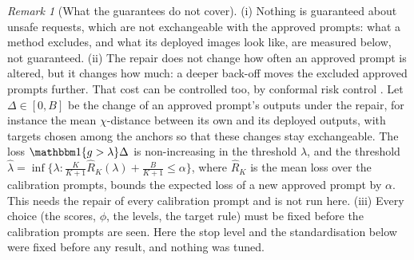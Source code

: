 \documentclass{article}
\theoremstyle{plain}
\theoremstyle{remark}
\newtheorem{remark}[theorem]{Remark}
\begin{document}
\begin{remark}[What the guarantees do not cover]\label{rem:combined}
(i) Nothing is guaranteed about unsafe requests, which are not exchangeable with the approved prompts: what a method excludes, and
what its deployed images look like, are measured below, not guaranteed. (ii) The repair does not change how often an approved
prompt is altered, but it changes how much: a deeper back-off moves the excluded approved prompts further. That cost can be
controlled too, by conformal risk control \citep{angelopoulos2024conformal}. Let $\Delta\in[0,B]$ be the change of an approved prompt's
outputs under the repair, for instance the mean $\chi$-distance between its own and its deployed outputs, with targets chosen among
the anchors so that these changes stay exchangeable. The loss $\mathbbm 1\{g>\lambda\}\Delta$ is non-increasing in the threshold
$\lambda$, and the threshold $\hat\lambda=\inf\{\lambda:\frac{K}{K+1}\hat R_K(\lambda)+\frac{B}{K+1}\le\alpha\}$, where $\hat R_K$ is the
mean loss over the calibration prompts, bounds the expected loss of a new approved prompt by $\alpha$. This needs the repair of every
calibration prompt and is not run here. (iii) Every choice (the scores, $\phi$, the levels, the target rule) must be fixed before the
calibration prompts are seen. Here the stop level and the standardisation below were fixed before any result, and nothing was tuned.
\end{remark}
\end{document}
